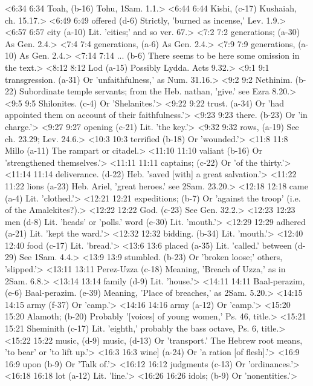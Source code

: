 <6:34 6:34  Toah, (b-16)  Tohu, 1Sam. 1.1.>
<6:44 6:44  Kishi, (c-17)  Kushaiah, ch. 15.17.>
<6:49 6:49  offered (d-6)  Strictly, 'burned as incense,' Lev. 1.9.>
<6:57 6:57  city (a-10)  Lit. 'cities;' and so ver. 67.>
<7:2 7:2  generations; (a-30) As Gen. 2.4.>
<7:4 7:4  generations, (a-6) As Gen. 2.4.>
<7:9 7:9  generations, (a-10)  As Gen. 2.4.>
<7:14 7:14  ... (b-6)  There seems to be here some omission in the text.>
<8:12 8:12  Lod (a-15)  Possibly Lydda. Acts 9.32.>
<9:1 9:1  transgression. (a-31)  Or 'unfaithfulness,' as Num. 31.16.>
<9:2 9:2  Nethinim. (b-22)  Subordinate temple servants; from the Heb. nathan, 'give.'  see Ezra 8.20.>
<9:5 9:5  Shilonites. (c-4)  Or 'Shelanites.'>
<9:22 9:22  trust. (a-34)  Or 'had appointed them on account of their faithfulness.'>
<9:23 9:23  there. (b-23)  Or 'in charge.'>
<9:27 9:27  opening (c-21)  Lit. 'the key.'>
<9:32 9:32  rows, (a-19)  See ch. 23.29; Lev. 24.6.>
<10:3 10:3  terrified (b-18)  Or 'wounded.'>
<11:8 11:8  Millo (a-11)  The rampart or citadel.>
<11:10 11:10  valiant (b-16)  Or 'strengthened themselves.'>
<11:11 11:11  captains; (c-22)  Or 'of the thirty.'>
<11:14 11:14  deliverance. (d-22)  Heb. 'saved [with] a great salvation.'>
<11:22 11:22  lions (a-23)  Heb. Ariel, 'great heroes.' see 2Sam. 23.20.>
<12:18 12:18  came (a-4)  Lit. 'clothed.'>
<12:21 12:21  expeditions; (b-7)  Or 'against the troop' (i.e. of the Amalekites?).>
<12:22 12:22  God. (c-23)  See Gen. 32.2.>
<12:23 12:23  men (d-8)  Lit. 'heads' or 'polls.'
  word (e-30)  Lit. 'mouth.'>
<12:29 12:29  adhered (a-21)  Lit. 'kept the ward.'>
<12:32 12:32  bidding. (b-34)  Lit. 'mouth.'>
<12:40 12:40  food (c-17)  Lit. 'bread.'>
<13:6 13:6  placed (a-35)  Lit. 'called.'
  between (d-29)  See 1Sam. 4.4.>
<13:9 13:9  stumbled. (b-23)  Or 'broken loose;' others, 'slipped.'>
<13:11 13:11  Perez-Uzza (c-18)  Meaning, 'Breach of Uzza,' as in 2Sam. 6.8.>
<13:14 13:14  family (d-9)  Lit. 'house.'>
<14:11 14:11  Baal-perazim, (e-6)  Baal-perazim. (e-39)
  Meaning, 'Place of breaches,' as 2Sam. 5.20.>
<14:15 14:15  army (f-37)  Or 'camp.'>
<14:16 14:16  army (a-12)  Or 'camp.'>
<15:20 15:20  Alamoth; (b-20)  Probably '[voices] of young women,' Ps. 46, title.>
<15:21 15:21  Sheminith (c-17)  Lit. 'eighth,' probably the bass octave, Ps. 6, title.>
<15:22 15:22  music, (d-9)  music, (d-13)
  Or 'transport.' The Hebrew root means, 'to bear' or 'to lift  up.'>
<16:3 16:3  wine] (a-24)  Or 'a ration [of flesh].'>
<16:9 16:9  upon (b-9)  Or 'Talk of.'>
<16:12 16:12  judgments (c-13)  Or 'ordinances.'>
<16:18 16:18  lot (a-12)  Lit. 'line.'>
<16:26 16:26  idols; (b-9)  Or 'nonentities.'>
